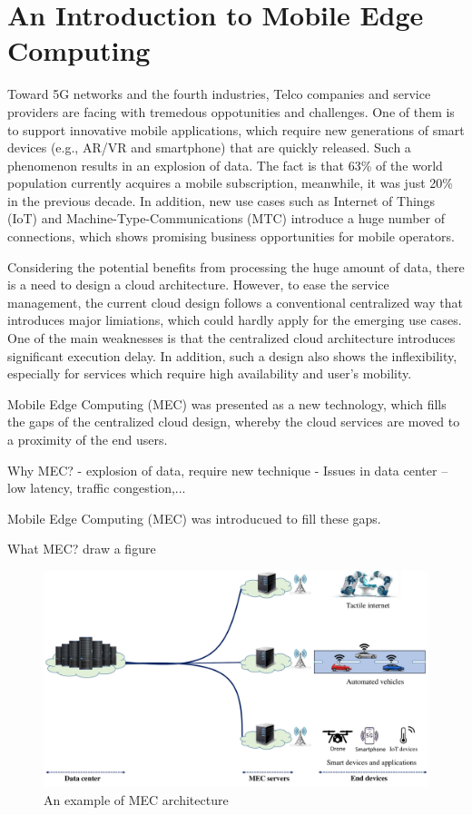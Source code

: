 \section{An Introduction to Mobile Edge Computing}  \label{intro}


Toward 5G networks and the fourth industries, Telco companies and service providers are facing with tremedous oppotunities and challenges. One of them is to support innovative mobile applications, which require new generations of smart devices (e.g., AR/VR and smartphone) that are quickly released. Such a phenomenon results in an explosion of data. The fact is that 63\% of the world population currently acquires a mobile subscription, meanwhile, it was just 20\% in the previous decade. In addition, new use cases such as Internet of Things (IoT) and Machine-Type-Communications (MTC) introduce a huge number of connections, which shows promising business opportunities for mobile operators.

Considering the potential benefits from processing the huge amount of data, there is a need to design a cloud architecture. However, to ease the service management, the current cloud design follows a conventional centralized way that introduces major limiations, which could hardly apply for the emerging use cases. One of the main weaknesses is that the centralized cloud architecture introduces significant execution delay. In addition, such a design also shows the inflexibility, especially for services which require high availability and user's mobility. 

Mobile Edge Computing (MEC) was presented as a new technology, which fills the gaps of the centralized cloud design, whereby the cloud services are moved to a proximity of the end users.

Why MEC? 
  - explosion of data, require new technique
  - Issues in data center -- low latency, traffic congestion,...

Mobile Edge Computing (MEC) was introducued to fill these gaps.

What MEC? draw a figure


\begin{figure}[H]
  \begin{center}
   \includegraphics[width=13cm]{./figures/mec-arch.pdf}
   \caption{An example of MEC architecture}
   \label{fig:mec-arch}
   \end{center}
\end{figure}
